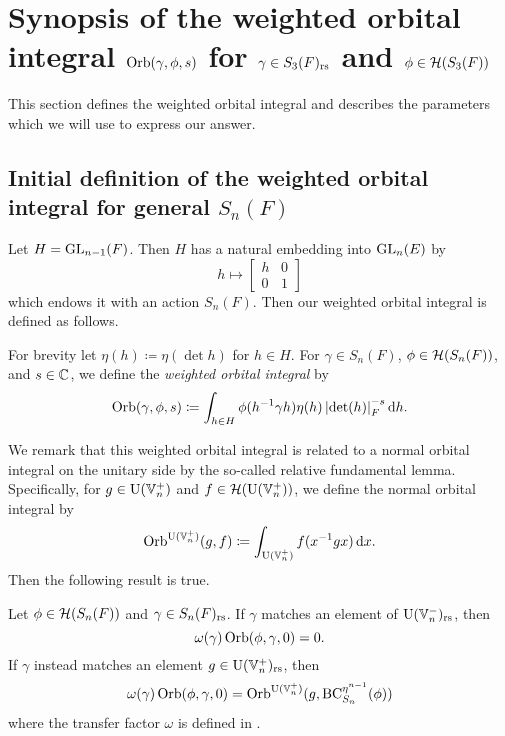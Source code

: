 \chapter{Synopsis of the weighted orbital integral $\operatorname{Orb}(\gamma, \phi, s)$ for $\gamma \in S_3(F)_{\mathrm{rs}}$ and $\phi \in \mathcal H(S_3(F))$}
\label{ch:orbital0}

This section defines the weighted orbital integral
and describes the parameters which we will use to express our answer.

\section{Initial definition of the weighted orbital integral for general $S_n(F)$}
Let $H = \operatorname{GL}_{n-1}(F)$.
Then $H$ has a natural embedding into $\operatorname{GL}_n(E)$ by
\[ h \mapsto \begin{bmatrix} h & 0 \\ 0 & 1 \end{bmatrix} \]
which endows it with an action $S_n(F)$.
Then our weighted orbital integral is defined as follows.
\begin{definition}
  For brevity let $\eta(h) \coloneqq \eta(\det h)$ for $h \in H$.
  For $\gamma \in S_n(F)$, $\phi \in \mathcal H(S_n(F))$, and $s \in \mathbb C$,
  we define the \emph{weighted orbital integral} by
  \[ \Orb(\gamma, \phi, s) \coloneqq
    \int_{h \in H} \phi(h\inv \gamma h) \eta(h)
    \left\lvert \det(h) \right\rvert_F^{-s} \odif h. \]
  \label{def:orbital0}
\end{definition}

We remark that this weighted orbital integral is related to
a normal orbital integral on the unitary side
by the so-called relative fundamental lemma.
Specifically, for $g \in \operatorname{U}(\mathbb V_n^+)$ and $f \in \mathcal H(\operatorname{U}(\mathbb V_n^+))$,
we define the normal orbital integral by
\[ \Orb^{\U(\VV_n^+)}(g, f) \coloneqq \int_{\U(\VV_n^+)} f(x^{-1}gx) \odif x. \]
Then the following result is true.
\begin{theorem}
  \label{thm:rel_fundamental_lemma}
  Let $\phi \in \mathcal H(S_n(F))$ and $\gamma \in S_n(F)_{\mathrm{rs}}$.
  If $\gamma$ matches an element of $\operatorname{U}(\mathbb V_n^-)_{\mathrm{rs}}$, then
  \[ \omega(\gamma) \operatorname{Orb}(\phi, \gamma, 0) = 0. \]
  If $\gamma$ instead matches an element $g \in \operatorname{U}(\mathbb V_n^+)_{\mathrm{rs}}$, then
  \[ \omega(\gamma) \operatorname{Orb}(\phi, \gamma, 0)
    = \operatorname{Orb}^{\operatorname{U}(\mathbb V_n^+)}(g, \operatorname{BC}^{\eta^{n-1}}_{S_n}(\phi)) \]
  where the transfer factor $\omega$ is defined in .
\end{theorem}

